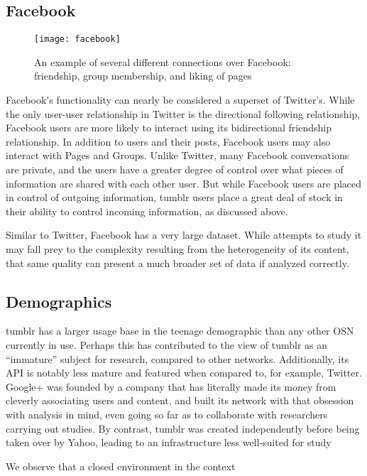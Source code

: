 \subsection{Facebook}
\begin{figure}[bht]
\centering
 \texttt{[image: facebook]}
 \caption{An example of several different connections over Facebook: friendship, group membership, and liking of pages}
 \label{fig:facebook}
\end{figure}
Facebook's functionality can nearly be considered a superset of Twitter's.  
While the 
only user-user relationship in Twitter is the directional following 
relationship, Facebook users are more likely to interact using its 
bidirectional friendship relationship.  In addition to users and their 
posts, Facebook users may also interact with Pages and Groups.  Unlike 
Twitter, many Facebook conversations are private, and the users have a 
greater degree of control over what pieces of information are shared 
with each other user.  But while Facebook users are placed in control of 
outgoing information, tumblr users place a great deal of stock in their 
ability to control incoming information, as discussed above.

 
Similar to Twitter, Facebook has a very large dataset.  While attempts 
to study it may fall prey to the complexity resulting from the 
heterogeneity of its content, that same quality can present a much 
broader set of data if analyzed correctly.

\subsection{Demographics}
tumblr has a larger usage base in the teenage demographic than any 
other OSN currently in use.  Perhaps this has contributed to the view 
of tumblr as an ``immature'' subject for research, compared to other 
networks.  Additionally, its API is notably less mature and 
featured when compared to, for example, Twitter.  Google+ was founded 
by a company that has literally made its money from cleverly 
associating users and content, and built its network with that 
obsession with analysis in mind, even going so far as to collaborate 
with researchers carrying out studies\cite{kairam2012talking}.  By contrast, tumblr was 
created independently before being taken over by Yahoo, leading to an 
infrastructure less well-suited for study

\cite{alexander2002introduction}

We observe that a closed environment in the context
